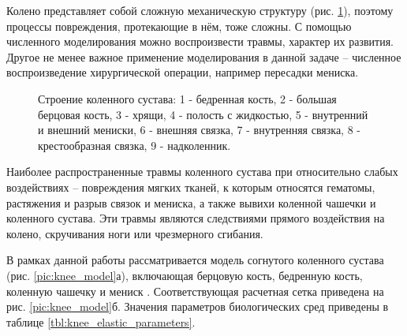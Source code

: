 Колено представляет собой сложную механическую структуру (рис. \ref{pic:knee_scheme}), поэтому процессы повреждения, протекающие в нём, тоже сложны. С помощью численного моделирования можно воспроизвести травмы, характер их развития. Другое не менее важное применение моделирования в данной задаче -- численное воспроизведение хирургической операции, например пересадки мениска. 

\begin{figure}[h]
\caption{Строение коленного сустава: 1 - бедренная кость, 2 - большая берцовая кость, 3 - хрящи, 4 - полость с жидкостью, 5 - внутренний и внешний мениски, 6 - внешняя связка, 7 - внутренняя связка, 8 - крестообразная связка, 9 - надколенник.}
\label{pic:knee_scheme}
\end{figure}

\clearpage
\newpage

Наиболее распространенные травмы коленного сустава при относительно слабых воздействиях -- повреждения мягких тканей, к которым относятся гематомы, растяжения и разрыв связок и мениска, а также вывихи коленной чашечки и коленного сустава. Эти травмы являются следствиями прямого воздействия на колено, скручивания ноги или чрезмерного сгибания.

В рамках данной работы рассматривается модель согнутого коленного сустава (рис. \ref{pic:knee_model}а), включающая берцовую кость, бедренную кость, коленную чашечку и мениск \cite{a7}. Соответствующая расчетная сетка приведена на рис. \ref{pic:knee_model}б. Значения параметров биологических сред приведены в таблице \ref{tbl:knee_elastic_parameters}.


